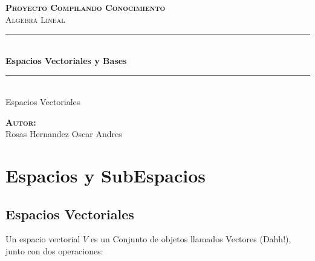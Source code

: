 \documentclass[12pt]{report}                                %
\author{Oscar Andrés Rosas}                                 %
\begin{document}
\begin{titlepage}

    \center
    \textbf{\textsc{\Large Proyecto Compilando Conocimiento}}\\[1.0cm] 
    \textsc{\Large Algebra Lineal}\\[1.0cm] 

    \rule{\linewidth}{0.5mm} \\[1.0cm]
        { \huge \bfseries Espacios Vectoriales y Bases}\\[1.0cm] 
    \rule{\linewidth}{0.5mm} \\[2.0cm]
    
    {\LARGE Espacios Vectoriales}\\[7cm] 
    
    \begin{center} \large
    \textbf{\textsc{Autor:}}\\
    Rosas Hernandez Oscar Andres
    \end{center}

    \vfill

\end{titlepage}

\tableofcontents{}
\clearpage

\chapter{Espacios y SubEspacios}
    \clearpage

    \section{Espacios Vectoriales}
        Un espacio vectorial $V$ es un Conjunto de objetos
        llamados Vectores (Dahh!), junto con dos operaciones:
\end{document}
